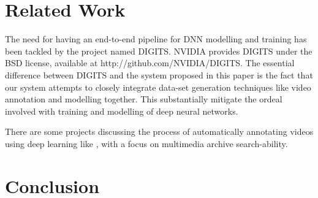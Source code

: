 \documentclass[conference]{IEEEtran}
\begin{document}
\section{Related Work}\label{sec.related}
The need for having an end-to-end pipeline for DNN modelling and training has been tackled by the project named DIGITS. NVIDIA provides DIGITS under the BSD license, available at http://github.com/NVIDIA/DIGITS. The essential difference between DIGITS and the system proposed in this paper is the fact that our system attempts to closely integrate data-set generation techniques like video annotation and modelling together. This substantially mitigate the ordeal involved with training and modelling of deep neural networks.

There are some projects discussing the process of automatically annotating videos using deep learning like \cite{baptist2016automatedendtoend}, with a focus on multimedia archive search-ability. 


\section{Conclusion}\label{sec.conclusion}













%
%
%
\end{document}
